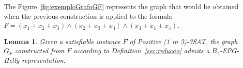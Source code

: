 \documentclass[9pt]{entcs}
\newtheorem{lema}{Lemma}[section]
\newtheorem{prove}{Proof}[section]
\begin{document}
The Figure~\ref{fig:exemploGrafoGF} represents the graph that would be obtained when the previous construction is applied to the formula $ F = (x_1 + x_2 + x_3) \wedge (x_2 + x_3 + x_4) \wedge (x_3 + x_1 + x_4)$.





\begin{lema}\label{lem:ida}
Given a satisfiable instance $F$ of {\sc Positive (1 in 3)-3SAT}, the graph $G_F$ constructed from $F$ according to Definition~\ref{sec:reducao} admits a $B_{1}$-EPG-Helly representation.
\end{lema}





% 


% 



% 


\end{document}
